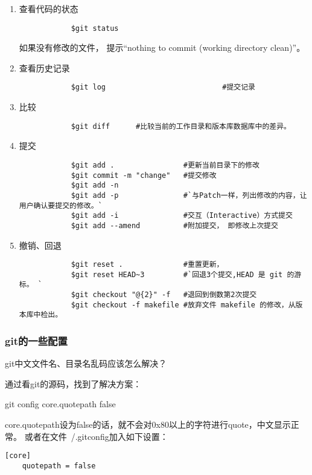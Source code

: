 \documentclass[a4paper,titlepage]{article}
\begin{document}
\begin{enumerate}
    \item 查看代码的状态
        \begin{lstlisting}
            $git status 
        \end{lstlisting}
        如果没有修改的文件， 提示“nothing to commit (working directory clean)”。    
    \item 查看历史记录
        \begin{lstlisting}
            $git log                           #提交记录
        \end{lstlisting}
    \item 比较
        \begin{lstlisting} 
            $git diff      #比较当前的工作目录和版本库数据库中的差异。
        \end{lstlisting}
    \item 提交
        \begin{lstlisting}
            $git add .                #更新当前目录下的修改
            $git commit -m "change"   #提交修改
            $git add -n 
            $git add -p               #`与Patch一样，列出修改的内容，让用户确认要提交的修改。`
            $git add -i               #交互（Interactive）方式提交 
            $git add --amend          #附加提交， 即修改上次提交
        \end{lstlisting}

    \item 撤销、回退 
        \begin{lstlisting} 
            $git reset .              #重置更新，
            $git reset HEAD~3         #`回退3个提交,HEAD 是 git 的游标。 `
            $git checkout "@{2}" -f   #退回到倒数第2次提交 
            $git checkout -f makefile #放弃文件 makefile 的修改，从版本库中检出。
        \end{lstlisting}
\end{enumerate}

\subsubsection{git的一些配置}
git中文文件名、目录名乱码应该怎么解决？

通过看git的源码，找到了解决方案：

{\color{blue}git config core.quotepath false}

core.quotepath设为false的话，就不会对0x80以上的字符进行quote，中文显示正常。
或者在文件~/.gitconfig加入如下设置：
\begin{verbatim}
[core]
	quotepath = false
\end{verbatim}
\end{document}
